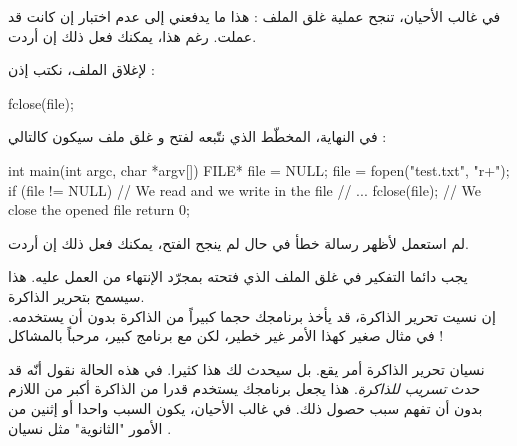 في غالب الأحيان، تنجح عملية غلق الملف : هذا ما يدفعني إلى عدم اختبار إن كانت
قد عملت. رغم هذا، يمكنك فعل ذلك إن أردت.

لإغلاق الملف، نكتب إذن :

\begin{Csource}
fclose(file);
\end{Csource}

في النهاية، المخطّط الذي نتّبعه لفتح و غلق ملف سيكون كالتالي :

\begin{Csource}
int main(int argc, char *argv[])
{
	FILE* file = NULL;
	file = fopen("test.txt", "r+");
	if (file != NULL)
	{
    		// We read and we write in the file
    		// ...
    		fclose(file); // We close the opened file
	}
	return 0;
}
\end{Csource}

لم استعمل
لأظهر رسالة خطأ في حال لم ينجح الفتح، يمكنك فعل ذلك إن أردت.

يجب دائما التفكير في غلق الملف الذي فتحته بمجرّد الإنتهاء من العمل عليه. هذا سيسمح بتحرير الذاكرة.\\
إن نسيت تحرير الذاكرة، قد يأخذ برنامجك حجما كبيراً من الذاكرة بدون أن يستخدمه. في مثال صغير كهذا الأمر غير خطير، لكن مع برنامج كبير، مرحباً بالمشاكل !

نسيان تحرير الذاكرة أمر يقع. بل سيحدث لك هذا كثيرا. في هذه الحالة نقول أنّه قد حدث
\textit{تسريب للذاكرة}.
هذا يجعل برنامجك يستخدم قدرا من الذاكرة أكبر من اللازم بدون أن تفهم سبب حصول ذلك. في غالب الأحيان، يكون السبب واحدا أو إثنين من الأمور "الثانوية" مثل نسيان
.
